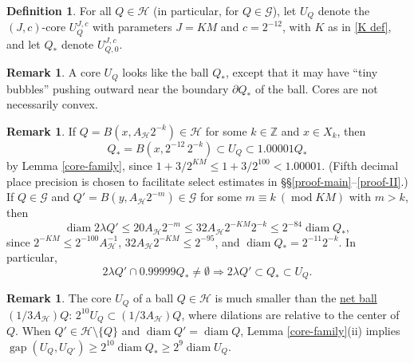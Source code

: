 \documentclass[12pt]{amsart}
\numberwithin{equation}{section}
\theoremstyle{plain}
\theoremstyle{definition}
\newtheorem{remark}[theorem]{Remark}
\newtheorem{definition}[theorem]{Definition}
\def\ZZ{\mathbb{Z}}
\newcommand{\diam}{\mathop\mathrm{diam}\nolimits}
\newcommand{\Mod}{\operatorname{mod}}
\newcommand{\gap}{\mathop\mathrm{gap}\nolimits}
\numberwithin{figure}{section}
\begin{document}
\begin{definition} For all $Q\in\mathscr{H}$ (in particular, for $Q\in\mathscr{G}$), let $U_Q$ denote the $(J,c)$-core $U^{J,c}_Q$ with parameters $J=KM$ and $c=2^{-12}$, with $K$ as in \eqref{K def}, and let $Q_*$ denote $U^{J,c}_{Q,0}$.\end{definition}

\begin{remark}A core $U_Q$ looks like the ball $Q_*$, except that it may have ``tiny bubbles'' pushing outward near the boundary $\partial Q_*$ of the ball. Cores are not necessarily convex.\end{remark}

\begin{remark}If $Q=B(x,A_\mathscr{H}2^{-k})\in\mathscr{H}$ for some $k\in\ZZ$ and $x\in X_k$, then \begin{equation} \label{shape-of-B1-cores} Q_*=B(x,2^{-12}\,2^{-k})\subset U_Q\subset 1.00001 Q_*\end{equation} by Lemma \ref{core-family}, since $1+3/2^{KM}\leq 1+3/2^{100}<1.00001$. (Fifth decimal place precision is chosen to facilitate select estimates in \S\S \ref{proof-main}--\ref{proof-II}.) If $Q\in\mathscr{G}$ and $Q'=B(y,A_\mathscr{H}2^{-m})\in\mathscr{G}$ for some $m\equiv k\ (\Mod KM)$ with $m>k$, then \begin{equation}\label{Q'-diam} \diam 2\lambda Q' \leq 20A_\mathscr{H}2^{-m} \leq 32A_\mathscr{H}2^{-KM}2^{-k}\leq 2^{-84}\diam Q_*,\end{equation} since $2^{-KM}\leq 2^{-100} A_\mathscr{H}^{-1}$, $32A_\mathscr{H}2^{-KM}\leq 2^{-95}$, and $\diam Q_*=2^{-11}2^{-k}$. In particular,  \begin{equation}\label{Q'-containment} 2\lambda Q'\cap 0.99999 Q_*\neq\emptyset \Longrightarrow 2\lambda Q'\subset Q_*\subset U_Q.\end{equation}\end{remark}

\begin{remark}\label{core-separation} The core $U_Q$ of a ball $Q\in\mathscr{H}$ is much smaller than the \hyperref[netball]{net ball} $(1/3A_\mathscr{H})Q$: $2^{10}U_Q\subset (1/3A_\mathscr{H}) Q$, where dilations are relative to the center of $Q$. When $Q'\in\mathscr{H}\setminus\{Q\}$ and $\diam Q'=\diam Q$, Lemma \ref{core-family}(ii) implies $\gap(U_Q,U_{Q'})\geq 2^{10}\diam Q_*\geq 2^9\diam U_Q$. %
\end{remark}
\end{document}
